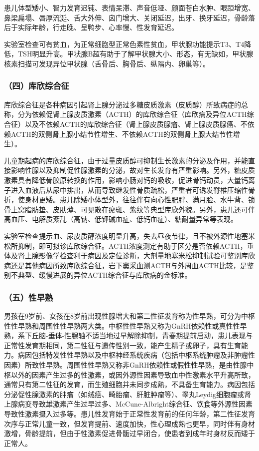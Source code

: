 患儿体型矮小、智力发育迟钝、表情呆滞、声音低哑、颜面苍白水肿、眼距增宽、鼻梁扁塌、唇厚流涎、舌大外伸、囟门增大、关闭延迟，出牙、换牙延迟，骨龄落后于实际年龄，行走晚、呈鸭步、心率慢、性发育延迟。

实验室检查可有贫血，为正常细胞型正常色素性贫血，甲状腺功能提示T3、T4降低，TSH明显升高。甲状腺B超有助于了解甲状腺大小、形态，有无缺如，甲状腺核素扫描可发现异位甲状腺（舌骨后、胸骨后、纵隔内、卵巢等）。

\subsubsection{（四）库欣综合征}

库欣综合征是各种病因引起肾上腺分泌过多糖皮质激素（皮质醇）所致病症的总称，分为依赖促肾上腺皮质激素（ACTH）的库欣综合征（库欣病及异位ACTH综合征）以及不依赖ACTH的库欣综合征（肾上腺皮质腺瘤、肾上腺皮质腺癌、不依赖ACTH的双侧肾上腺小结节性增生、不依赖ACTH的双侧肾上腺大结节性增生）。

儿童期起病的库欣综合征，由于过量皮质醇可抑制生长激素的分泌及作用，并能直接影响性腺以及抑制促性腺激素的分泌，故对生长发育有严重影响。另外，糖皮质激素具有降低骨胶原转换的作用，影响小肠对钙的吸收，促进骨钙动员，大量钙离子进入血液后从尿中排出，从而导致继发性骨质疏松，严重者可诱发脊椎压缩性骨折，使身材更矮。患儿除矮小体型外，往往伴有向心性肥胖、满月脸、水牛背、锁骨上窝脂肪垫、皮肤薄、可见散在瘀斑、紫纹等典型库欣外貌。另外，患儿还可伴高血压、电解质紊乱（高钠、低钾碱血症、低钙血症）、糖耐量异常等表现。

实验室检查提示血、尿皮质醇浓度明显升高，失去昼夜节律，且不被外源性地塞米松所抑制，即可拟诊库欣综合征。ACTH浓度测定有助于区分是否依赖ACTH，垂体及肾上腺影像学检查利于病因及定位诊断，大剂量地塞米松抑制试验可鉴别库欣病还是其他病因所致库欣综合征，岩下窦采血测ACTH与外周血ACTH比较，是鉴别不典型、缓慢进展的异位ACTH综合征与库欣病的金标准。

\subsubsection{（五）性早熟}

男孩在9岁前、女孩在8岁前出现性腺增大和第二性征发育称为性早熟，可分为中枢性性早熟和周围性性早熟两大类。中枢性性早熟又称为GnRH依赖性或真性性早熟，系下丘脑-垂体-性腺轴不适当地过早解除抑制，青春期提前启动，患儿表现与正常性发育期相同，第二性征与遗传性别一致，能产生精子或卵子，具有生育能力。病因包括特发性性早熟以及中枢神经系统疾病（包括中枢系统肿瘤及非肿瘤性因素）所致性早熟。周围性性早熟又称非GnRH依赖性或假性性早熟，是由性腺中枢以外的因素产生过多的性激素，或因外源性因素导致血中性激素水平升高所致，通常只有第二性征的发育，而生殖细胞并未同步成熟，不具备生育能力。病因包括分泌促性腺激素的肿瘤（如绒癌、畸胎瘤、肝脏肿瘤等）、睾丸Leydig细胞瘤或肾上腺病变导致雄激素产生过早过多、McCune-Albright综合征、饮食等外源性因素导致性激素摄入过多等。患儿性发育始于正常性发育前的任何年龄，第二性征发育次序与正常儿童一致，但发育提前、速度加快，性心理成熟也更早，同时伴有身材激增，骨龄提前，但由于性激素促进骨骺过早闭合，使患者到成年时身材反而矮于正常人。

